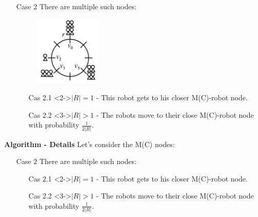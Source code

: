 \documentclass{beamer}
\begin{document}
\begin{frame}
	\begin{itemize}
		\item[Case 2] There are multiple such nodes:
			\begin{figure}[h]
   				\includegraphics[width=0.3\textwidth]{images/random_configuration.png}
			\end{figure}
			\begin{itemize}
				\item[Cas 2.1]<2->$|R| = 1$ - This robot gets to his closer M(C)-robot node. 
				\item[Cas 2.2]<3->$|R| > 1$ - The robots move to their close M(C)-robot node with probability $\frac{1}{2|R|}$.
			\end{itemize}
	\end{itemize}

\end{frame}

\begin{frame}

	\textbf{Algorithm - Details}	
	Let's consider the M(C) nodes:
	\begin{itemize}
		\item[Case 2] There are multiple such nodes:
			\begin{itemize}
				\item[Cas 2.1]<2->$|R| = 1$ - This robot gets to his closer M(C)-robot node. 
				\item[Cas 2.2]<3->$|R| > 1$ - The robots move to their close M(C)-robot node with probability $\frac{1}{2|R|}$.
			\end{itemize}
	\end{itemize}

\end{frame}
\end{document}

